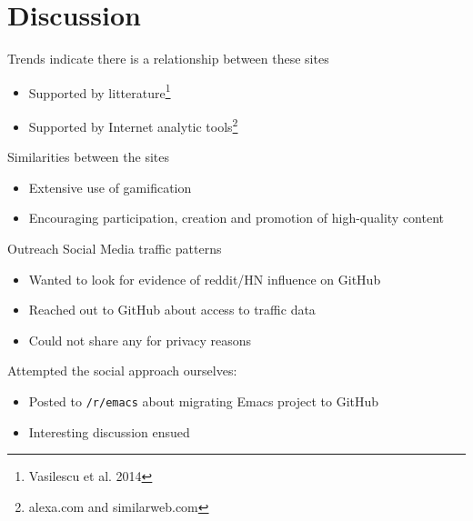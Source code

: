 \documentclass{beamer}
\begin{document}


\section{Discussion}

\begin{frame}
  Trends indicate there is a relationship between these sites
  \begin{itemize}
  \item Supported by litterature\footnote{Vasilescu et al. 2014}
  \item Supported by Internet analytic tools\footnote{alexa.com and similarweb.com}
  \end{itemize}
  Similarities between the sites
  \begin{itemize}
  \item Extensive use of gamification
  \item Encouraging participation, creation and promotion of high-quality content
  \end{itemize}
\end{frame}

\begin{frame}[allowframebreaks]{Outreach}
  Social Media traffic patterns
  \begin{itemize}
  \item Wanted to look for evidence of reddit/HN influence on GitHub
  \item Reached out to GitHub about access to traffic data
  \item Could not share any for privacy reasons
    \end{itemize}

  \framebreak
  
  Attempted the social approach ourselves:
  \begin{itemize}
  \item Posted\footnotemark{} to \texttt{/r/emacs}
    about migrating Emacs project to GitHub
  \item Interesting discussion ensued
  \end{itemize}

\end{frame}
\end{document}
